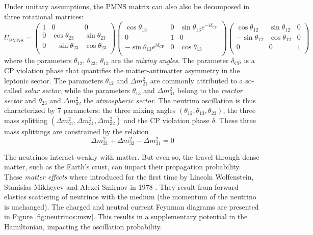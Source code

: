 Under unitary assumptions, the PMNS matrix can also also be decomposed in three rotational matrices:
\begin{equation}
  U_{\text{PMNS}} = \begin{pmatrix}
    1 & 0 & 0 \\
    0 & \cos \theta_{23} & \sin \theta_{23} \\
    0 & -\sin \theta_{23} & \cos \theta_{23} \\
  \end{pmatrix} \begin{pmatrix}
    \cos \theta_{13} & 0 & \sin \theta_{13} e^{-i\delta_{\text{CP}}}\\
    0 & 1 & 0 \\
    -\sin \theta_{13} e^{i\delta_{\text{CP}}} & 0 &  \cos \theta_{13} \\
  \end{pmatrix} \begin{pmatrix}
    \cos \theta_{12} & \sin \theta_{12} & 0 \\
    -\sin \theta_{12} & \cos \theta_{12} & 0 \\
    0 & 0 & 1 \\
  \end{pmatrix}
\end{equation}
where the parameters $\theta_{12}$, $\theta_{23}$, $\theta_{13}$ are the \textit{mixing angles}. The parameter $\delta_{\text{CP}}$ is a CP violation phase that quantifies the matter-antimatter asymmetry in the leptonic sector. The parameters $\theta_{12}$ and $\Delta m^2_{21}$ are commonly attributed to a so-called \textit{solar sector}, while the parameters $\theta_{13}$ and $\Delta m^2_{31}$ belong to the \textit{reactor sector} and $\theta_{23}$ and $\Delta m^2_{32}$ the \textit{atmospheric sector}. The neutrino oscillation is thus characterized by 7 parameters: the three mixing angles $(\theta_{12}, \theta_{13}, \theta_{23})$, the three mass splitting $(\Delta m^2_{21}, \Delta m^2_{31}, \Delta m^2_{32})$ and the CP violation phase $\delta$.
These three mass splittings are constrained by the relation
\begin{equation}
  \Delta m^2_{21} + \Delta m^2_{32} - \Delta m^2_{31} = 0
\end{equation}

The neutrinos interact weakly with matter. But even so, the travel through dense matter, such as the Earth's crust, can impact their propagation probability. These \textit{matter effects} where introduced for the first time by Lincoln Wolfenstein, Stanislas Mikheyev and Alexei Smirnov in 1978 \cite{wolfenstein_neutrino_1978}. They result from forward elastics scattering of neutrinos with the medium (the momentum of the neutrino is unchanged). The charged and neutral current Feynman diagrams are presented in Figure \ref{fig:neutrinos:msw}. This results in a supplementary potential in the Hamiltonian, impacting the oscillation probability.


